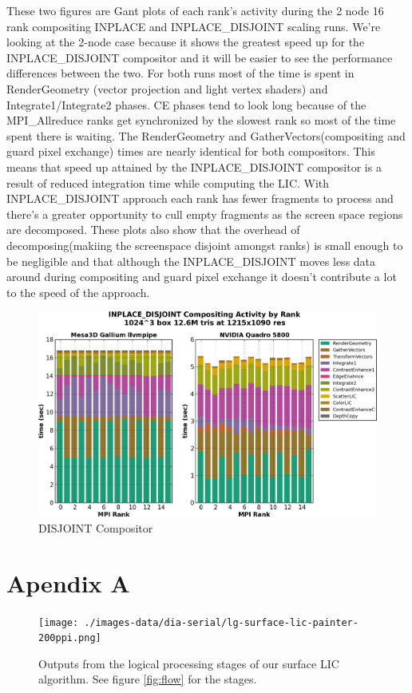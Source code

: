\documentclass[a4paper,10pt]{article}
\begin{document}
These two figures are Gant plots of each rank's activity during the 2 node 16 rank compositing INPLACE and INPLACE\_DISJOINT scaling runs. We're looking at the 2-node case because it shows the greatest speed up for the INPLACE\_DISJOINT compositor and it will be easier to see the performance differences between the two. For both runs most of the time is spent in RenderGeometry (vector projection and light vertex shaders) and Integrate1/Integrate2 phases. CE phases tend to look long because of the MPI\_Allreduce ranks get synchronized by the slowest rank so most of the time spent there is waiting. The RenderGeometry and GatherVectors(compositing and guard pixel exchange) times are nearly identical for both compositors. This means that speed up attained by the INPLACE\_DISJOINT compositor is a result of reduced integration time while computing the LIC. With INPLACE\_DISJOINT approach each rank has fewer fragments to process and there's a greater opportunity to cull empty fragments as the screen space regions are decomposed. These plots also show that the overhead of decomposing(makiing the screenspace disjoint amongst ranks) is small enough to be negligible and that although the INPLACE\_DISJOINT moves less data around during compositing and guard pixel exchange it doesn't contribute a lot to the speed of the approach.

\begin{figure}[h]
 \centering
 \includegraphics[width=1.0\textwidth]{./scaling-gant-inplace-disjoint-composite-gpu-mesa.png}
 \caption{DISJOINT Compositor}
 \label{fig:disj-comp}
\end{figure}
\FloatBarrier

\section{Apendix A}
\label{sec:pslic-outputs}
\begin{figure}[ht]
	\centering
	\texttt{[image: ./images-data/dia-serial/lg-surface-lic-painter-200ppi.png]}
	\label{fig:lic2d-outputs}
  \caption{Outputs from the logical processing stages of our surface LIC algorithm. See figure \ref{fig:flow} for the stages.}
\end{figure}
\FloatBarrier
\end{document}
